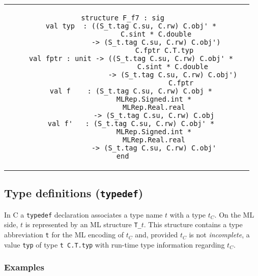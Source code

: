 \documentclass[titlepage,letterpaper]{article}
\begin{document}
\begin{small}
\begin{center}
\begin{tabular}{c|c}
\begin{minipage}{4in}
\begin{verbatim}
structure F_f7 : sig
    val typ  : ((S_t.tag C.su, C.rw) C.obj' *
                C.sint * C.double
                -> (S_t.tag C.su, C.rw) C.obj')
                    C.fptr C.T.typ
    val fptr : unit -> ((S_t.tag C.su, C.rw) C.obj' *
                        C.sint * C.double
                        -> (S_t.tag C.su, C.rw) C.obj')
                            C.fptr
    val f    : (S_t.tag C.su, C.rw) C.obj *
               MLRep.Signed.int *
               MLRep.Real.real
               -> (S_t.tag C.su, C.rw) C.obj
    val f'   : (S_t.tag C.su, C.rw) C.obj' *
               MLRep.Signed.int *
               MLRep.Real.real
               -> (S_t.tag C.su, C.rw) C.obj'
end

\end{verbatim}
\end{minipage}
\end{tabular}
\end{center}
\end{small}

\subsection{Type definitions ({\tt typedef})}

In C a {\tt typedef} declaration associates a type name $t$ with a
type $t_C$.  On the ML side, $t$ is represented by an ML structure
{\tt T\_$t$}.  This structure contains a type abbreviation {\tt t} for
the ML encoding of $t_C$ and, provided $t_C$ is not {\em incomplete},
a value {\tt typ} of type {\tt t C.T.typ} with run-time type
information regarding $t_C$.

\subsubsection*{Examples}
\end{document}
